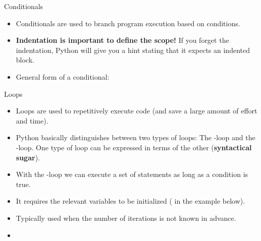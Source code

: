 \begin{frame}
	
\end{frame}



\begin{dwHeaderFrame}{Conditionals}
	\begin{itemize}
		\item Conditionals are used to branch program execution based on conditions.
		\item \textbf{Indentation is important to define the scope!} If you forget the indentation,
			Python will give you a hint stating that it expects an indented block.
		\item General form of a conditional:
	\end{itemize}
	
	
\end{dwHeaderFrame}


\begin{dwHeaderFrame}{Loops}
	\begin{itemize}
		\item Loops are used to repetitively execute code (and save a large amount of effort and time).
		\item Python basically distinguishes between two types of loops: The -loop and the -loop.
			One type of loop can be expressed in terms of the other (\textbf{syntactical sugar}).
	\end{itemize}
	
	\begin{itemize}
		\item With the -loop we can execute a set of statements as long as a condition is true.
		\item It requires the relevant variables to be initialized ( in the example below).
		\item Typically used when the number of iterations is not known in advance.
	\end{itemize}
	
	
\end{dwHeaderFrame}


\begin{frame}
	\begin{itemize}
		\item 
	\end{itemize}
\end{frame}


